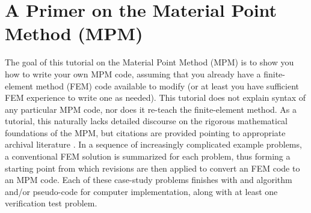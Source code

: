 \chapter{A Primer on the Material Point Method (MPM)}
The goal of this tutorial on the Material Point Method (MPM) is to show you how to write your own MPM code, assuming that you already have a finite-element method (FEM) code available to modify (or at least you have sufficient FEM experience to write one as needed). This tutorial does not explain syntax of any particular MPM code, nor does it re-teach the finite-element method. As a tutorial, this \manuscript naturally lacks detailed discourse on the rigorous mathematical foundations of the MPM, but citations are provided pointing to appropriate archival literature \cite{SulskyLoveXXXX}. In a sequence of increasingly complicated example problems, a conventional FEM solution is summarized for each problem, thus forming a starting point from which revisions are then applied to convert an FEM code to an MPM code. Each of these case-study problems finishes with and algorithm and/or pseudo-code for computer implementation, along with at least one verification test problem.